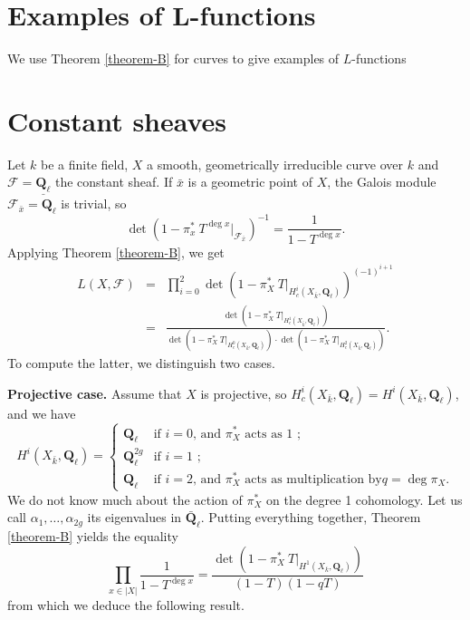 \section{Examples of L-functions}
\label{section-examples-L-functions}

\noindent
We use Theorem \ref{theorem-B} for curves to give examples of $L$-functions





\section{Constant sheaves}
\label{section-L-function-constant-sheaf}

\noindent
Let $k$ be a finite field, $X$ a smooth, geometrically irreducible curve over
$k$ and $\mathcal{F} = \underline{\mathbf{Q}_\ell}$ the constant sheaf. If
$\bar x$ is a geometric point of $X$, the Galois module
$\mathcal{F}_{\bar x} = \mathbf{Q}_\ell$ is trivial, so
$$
\det\left(1-\pi_x^*\ T^{\deg x}\Big|_{\mathcal{F}_{\bar x}}\right)^{-1} =
\frac{1}{1-T^{\deg x}}.
$$
Applying Theorem \ref{theorem-B}, we get
\begin{eqnarray*}
L(X, \mathcal{F}) & = & \prod_{i=0}^2 \det\left(1-\pi_X^*\
T\big|_{H_c^i(X_{\bar k}, \mathbf{Q}_\ell)}\right)^{(-1)^{i+1}} \\
& = &
\frac{\det\left(1-\pi_X^*\ T\big|_{H_c^1(X_{\bar k},
\mathbf{Q}_\ell)}\right)}{\det\left(1-\pi_X^*\ T\big|_{H_c^0(X_{\bar k},
\mathbf{Q}_\ell)}\right)\cdot\det\left(1-\pi_X^*\ T\big|_{H_c^2(X_{\bar k},
\mathbf{Q}_\ell)}\right)}.
\end{eqnarray*}
To compute the latter, we distinguish two cases.


\medskip\noindent
{\bf Projective case.}
Assume that $X$ is projective, so $H_c^i(X_{\bar k}, \mathbf{Q}_\ell) =
H^i(X_{\bar k}, \mathbf{Q}_\ell)$, and we have
$$
H^i(X_{\bar k}, \mathbf{Q}_\ell) =
\left\{
\begin{matrix}
\mathbf{Q}_\ell & \text{if $i = 0$, and $\pi_X^*$ acts as 1 ;} \\
\mathbf{Q}_\ell^{2g} & \text{if $i = 1$ ;} \\
\mathbf{Q}_\ell & \text{if $i = 2$, and $\pi_X^*$ acts as multiplication by
$q=\deg \pi_X$.}
\end{matrix}
\right.
$$
We do not know much about the action of $\pi_X^*$ on the degree 1 cohomology.
Let us call $\alpha_1, \ldots, \alpha_{2g}$ its eigenvalues in
$\bar{\mathbf{Q}}_\ell$. Putting everything together,
Theorem \ref{theorem-B}
yields the equality
$$
\prod_{x\in |X|} \frac{1}{1-T^{\deg x}} = \frac{\det\left(1- \pi_X^*\
T\big|_{H^1(X_{\bar k}, \mathbf{Q}_\ell)}\right)}{(1-T)(1-qT)}
$$
from which we deduce the following result.

